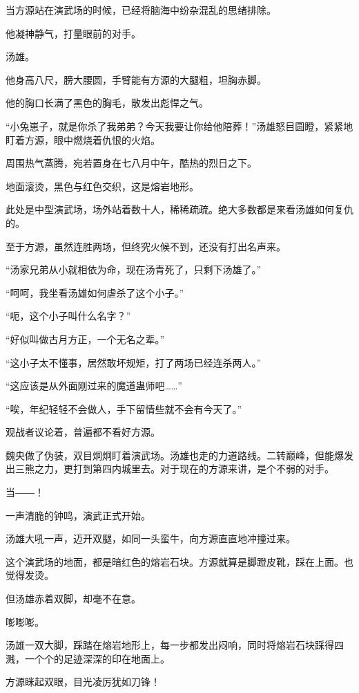 
\begin{this_body}

当方源站在演武场的时候，已经将脑海中纷杂混乱的思绪排除。

他凝神静气，打量眼前的对手。

汤雄。

他身高八尺，膀大腰圆，手臂能有方源的大腿粗，坦胸赤脚。

他的胸口长满了黑色的胸毛，散发出彪悍之气。

“小兔崽子，就是你杀了我弟弟？今天我要让你给他陪葬！”汤雄怒目圆瞪，紧紧地盯着方源，眼中燃烧着仇恨的火焰。

周围热气蒸腾，宛若置身在七八月中午，酷热的烈日之下。

地面滚烫，黑色与红色交织，这是熔岩地形。

此处是中型演武场，场外站着数十人，稀稀疏疏。绝大多数都是来看汤雄如何复仇的。

至于方源，虽然连胜两场，但终究火候不到，还没有打出名声来。

“汤家兄弟从小就相依为命，现在汤青死了，只剩下汤雄了。”

“呵呵，我坐看汤雄如何虐杀了这个小子。”

“呃，这个小子叫什么名字？”

“好似叫做古月方正，一个无名之辈。”

“这小子太不懂事，居然敢坏规矩，打了两场已经连杀两人。”

“这应该是从外面刚过来的魔道蛊师吧……”

“唉，年纪轻轻不会做人，手下留情些就不会有今天了。”

观战者议论着，普遍都不看好方源。

魏央做了伪装，双目炯炯盯着演武场。汤雄也走的力道路线。二转巅峰，但能爆发出三熊之力，更打到第四内城里去。对于现在的方源来讲，是个不弱的对手。

当――！

一声清脆的钟鸣，演武正式开始。

汤雄大吼一声，迈开双腿，如同一头蛮牛，向方源直直地冲撞过来。

这个演武场的地面，都是暗红色的熔岩石块。方源就算是脚蹬皮靴，踩在上面。也觉得发烫。

但汤雄赤着双脚，却毫不在意。

嘭嘭嘭。

汤雄一双大脚，踩踏在熔岩地形上，每一步都发出闷响，同时将熔岩石块踩得四溅，一个个的足迹深深的印在地面上。

方源眯起双眼，目光凌厉犹如刀锋！


\end{this_body}
